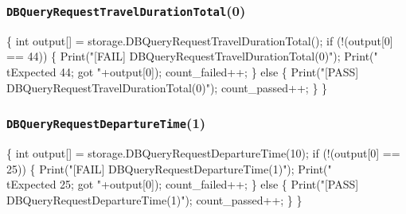 \documentclass{article}
\def\nwendcode{\endtrivlist \endgroup}
\let\nwdocspar=\par
\theoremstyle{definition}
\begin{document}
\subsubsection{{\tt{}DBQueryRequestTravelDurationTotal}(0)}
\nwenddocs{}\endmoddef{}
\{
  int output[] = storage.DBQueryRequestTravelDurationTotal();
  if (!(output[0] == 44)) \{
    Print("[FAIL] DBQueryRequestTravelDurationTotal(0)");
    Print("\\tExpected 44; got "+output[0]);
    count_failed++;
  \} else \{
    Print("[PASS] DBQueryRequestTravelDurationTotal(0)");
    count_passed++;
  \}
\}
\nwendcode{}\nwdocspar
\subsubsection{{\tt{}DBQueryRequestDepartureTime}(1)}
\nwenddocs{}\endmoddef{}
\{
  int output[] = storage.DBQueryRequestDepartureTime(10);
  if (!(output[0] == 25)) \{
    Print("[FAIL] DBQueryRequestDepartureTime(1)");
    Print("\\tExpected 25; got "+output[0]);
    count_failed++;
  \} else \{
    Print("[PASS] DBQueryRequestDepartureTime(1)");
    count_passed++;
  \}
\}
\nwendcode{}\nwdocspar
\end{document}
